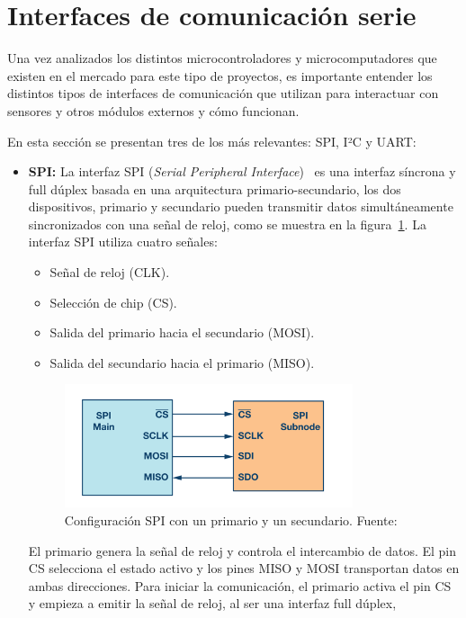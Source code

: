\section{Interfaces de comunicación serie}
Una vez analizados los distintos microcontroladores y microcomputadores que existen en el mercado para este tipo de proyectos,
es importante entender los distintos tipos de interfaces de comunicación que utilizan para interactuar con sensores y otros módulos externos y cómo funcionan.

En esta sección se presentan tres de los más relevantes: SPI, I²C y UART:

\begin{itemize}
    \item \textbf{SPI:} La interfaz SPI (\emph{Serial Peripheral Interface})~\cite{dhaker_spi} es una interfaz síncrona y full dúplex basada en una arquitectura primario-secundario,
    los dos dispositivos, primario y secundario pueden transmitir datos simultáneamente sincronizados con una señal de reloj, como se muestra en la figura~\ref{fig:spi}.
    La interfaz SPI utiliza cuatro señales:
    \begin{itemize}
        \item Señal de reloj (CLK).
        \item Selección de chip (CS).
        \item Salida del primario hacia el secundario (MOSI).
        \item Salida del secundario hacia el primario (MISO).
    \end{itemize}
    \begin{figure}[h]
        \centering
        \includegraphics[width=0.8\textwidth]{Imagenes/Bitmap/spi}
        \caption{Configuración SPI con un primario y un secundario. Fuente: \cite{dhaker_spi}}
        \label{fig:spi}
    \end{figure}
    El primario genera la señal de reloj y controla el intercambio de datos.
    El pin CS selecciona el estado activo y los pines MISO y MOSI transportan datos en ambas direcciones.
    Para iniciar la comunicación, el primario activa el pin CS y empieza a emitir la señal de reloj, al ser una interfaz full dúplex,

\end{itemize}
